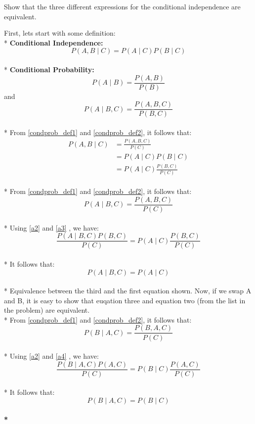 \documentclass{article}
\begin{document}
Show that the three different expressions for the conditional independence are
equivalent.

First, lets start with some definition:\\*
{\bf Conditional Independence:}
\begin{equation}
P(A,B \mid C) = P(A \mid C)P(B \mid C) 
\label{condindep_def}
\end{equation}
\\*
{\bf Conditional Probability:}
\begin{equation}
P(A \mid B) = \frac{P(A,B)}{P(B)}
\label{condprob_def1}
\end{equation}
and
\begin{equation}
P(A \mid B,C) = \frac{P(A,B,C)}{P(B,C)}
\label{condprob_def2}
\end{equation}
\\*
From \ref{condprob_def1} and \ref{condprob_def2}, it follows that:
\begin{align}
P(A,B \mid C) &= \frac{P(A,B,C)}{P(C)} \label{a2}\\
&= P(A \mid C)P(B \mid C) \\
&= P(A \mid C)\frac{P(B,C)}{P(C)}
\end{align}
\\*
From \ref{condprob_def1} and \ref{condprob_def2}, it follows that:
\begin{equation}
P(A \mid B,C) = \frac{P(A,B,C)}{P(C)}
\label{a3}
\end{equation}
\\*
Using \ref{a2} and \ref{a3} , we have:
\begin{equation}
\frac{P(A \mid B,C)P(B,C)}{P(C)} = P(A \mid C)\frac{P(B,C)}{P(C)}
\end{equation}
\\*
It follows that:
\begin{equation}
P(A \mid B,C) = P(A \mid C)
\end{equation}
\\*
Equivalence between the third and the first equation shown. Now, if we swap A
and B, it is easy to show that euqation three and equation two (from the list
in the problem) are equivalent.
\\*
From \ref{condprob_def1} and \ref{condprob_def2}, it follows that:
\begin{equation}
P(B \mid A,C) = \frac{P(B,A,C)}{P(C)}
\label{a4}
\end{equation}
\\*
Using \ref{a2} and \ref{a4} , we have:
\begin{equation}
\frac{P(B \mid A,C)P(A,C)}{P(C)} = P(B \mid C)\frac{P(A,C)}{P(C)}
\end{equation}
\\*
It follows that:
\bf{
\begin{equation}
P(B \mid A,C) = P(B \mid C)
\end{equation}
}
\\* \\ \\ \\
\end{document}

